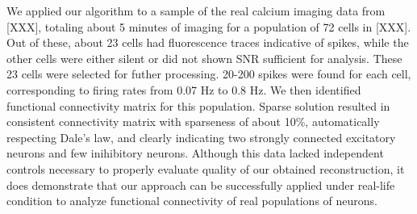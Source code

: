We applied our algorithm to a sample of the real calcium imaging data from [XXX], totaling about 5 minutes of imaging for a population of 72 cells in [XXX]. Out of these, about 23 cells had fluorescence traces indicative of spikes, while the other cells were either silent or did not shown SNR sufficient for analysis. These 23 cells were selected for futher processing. 20-200 spikes were found for each cell, corresponding to firing rates from 0.07 Hz to 0.8 Hz.
We then identified functional connectivity matrix for this population. Sparse solution resulted in consistent connectivity matrix with sparseness of about 10\%, automatically respecting Dale's law, and clearly indicating two strongly connected excitatory neurons and few inihibitory neurons. Although this data lacked independent controls necessary to properly evaluate quality of our obtained reconstruction, it does demonstrate that our approach can be successfully applied under real-life condition to analyze functional connectivity of real populations of neurons.

